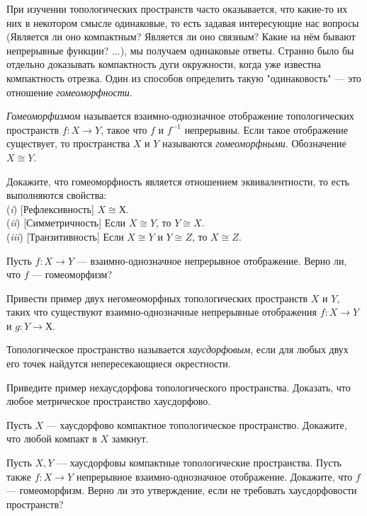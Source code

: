 \documentclass[a4paper,12pt]{article}
\begin{document}

{\footnotesize
При изучении топологических пространств часто оказывается, что какие-то их них в некотором смысле одинаковые, то есть задавая интересующие нас вопросы (Является ли оно компактным? Является ли оно связным? Какие на нём бывают непрерывные функции? ...), мы получаем одинаковые ответы. Странно было бы отдельно доказывать компактность дуги окружности, когда уже известна компактность отрезка. Один из способов определить такую "одинаковость" --- это отношение \emph{гомеоморфности}.

}

    \emph{Гомеоморфизмом} называется взаимно-однозначное отображение топологических пространств $f \colon X \to Y$, такое что $f$ и $f^{-1}$ непрерывны. Если такое отображение существует, то пространства $X$ и $Y$ называются \emph{гомеоморфными}. Обозначение $X \cong Y$.

    Докажите, что гомеоморфность является отношением эквивалентности, то есть выполняются свойства:\\
    ({\it i\/}) [Рефлексивность] $X \cong Х$. \\
    ({\it ii\/}) [Симметричность] Если $X \cong Y$, то $Y \cong X$.\\
    ({\it iii\/}) [Транзитивность] Если $X \cong Y$ и $Y \cong Z$, то $X \cong Z$.

    Пусть $f \colon X \to Y$ --- взаимно-однозначное непрерывное отображение. Верно ли, что $f$ --- гомеоморфизм?

   Привести пример двух негомеоморфных топологических пространств $X$ и $Y$, таких что существуют взаимно-однозначные непрерывные отображения $f\colon X \to Y$ и $g\colon Y \to Х$.

    Топологическое пространство называется \emph{хаусдорфовым}, если для любых двух его точек найдутся непересекающиеся окрестности.

    Приведите пример нехаусдорфова топологического пространства.
    Доказать, что любое метрическое пространство хаусдорфово.

    Пусть $X$ --- хаусдорфово компактное топологическое пространство. Докажите, что любой компакт в $X$ замкнут.

     Пусть $X, Y$ --- хаусдорфовы компактные топологические пространства. Пусть также $f\colon X \to Y$ непрерывное взаимно-однозначное отображение. Докажите, что $f$ --- гомеоморфизм.
     Верно ли это утверждение, если не требовать хаусдорфовости пространств?
\end{document}

